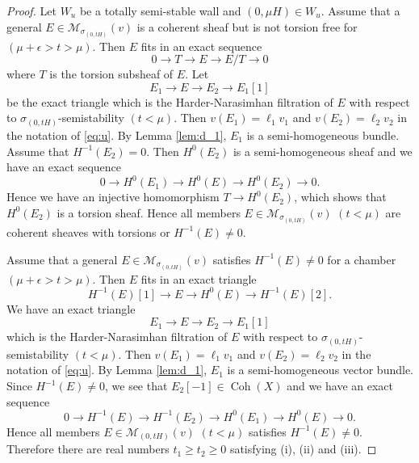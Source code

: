 \documentclass[10pt]{amsart}
\def\cal{\mathcal}
\newcommand{\Coh}{\operatorname{Coh}}
\numberwithin{equation}{section}
\theoremstyle{plain}
\theoremstyle{definition}
\theoremstyle{remark}
\begin{document}
\begin{proof}
Let $W_{u}$ be a totally semi-stable wall and $(0,\mu H) \in W_{u}$. 
Assume that a general $E \in {\cal M}_{\sigma_{(0,tH)}}(v)$ is a coherent sheaf but 
is not torsion free for $(\mu+\epsilon >t>\mu)$.
Then $E$ fits in an exact sequence
$$
0 \to T \to E \to E/T \to 0
$$
where $T$ is the torsion subsheaf of $E$.
Let   
$$
E_1 \to E \to E_2 \to E_1[1]
$$
be the exact triangle
which is the Harder-Narasimhan filtration of $E$ 
with respect to $\sigma_{(0,tH)}$-semistability $(t<\mu)$. 
Then $v(E_1)=\ell_1 v_1$ and $v(E_2)=\ell_2 v_2$ in the notation of \eqref{eq:u}.
By Lemma \ref{lem:d_1}, $E_1$ is a semi-homogeneous bundle.
Assume that $H^{-1}(E_2)=0$.
Then $H^0(E_2)$ is a semi-homogeneous sheaf and
we have an exact sequence
\begin{equation}\label{eq:T}
0 \to H^0(E_1) \to H^0(E) \to H^0(E_2) \to 0.
\end{equation}
Hence we have an injective homomorphism $T \to H^0(E_2)$, which
shows that $H^0(E_2)$ is a torsion sheaf. 
Hence all members $E \in {\cal M}_{\sigma_{(0,tH)}}(v)$ $(t<\mu)$
are 
coherent sheaves with torsions or $H^{-1}(E) \ne 0$.

Assume that a general $E \in {\cal M}_{\sigma_{(0,tH)}}(v)$
satisfies $H^{-1}(E) \ne 0$ 
for a chamber $(\mu+\epsilon>t>\mu)$.
Then $E$ 
fits in an exact triangle
$$
H^{-1}(E)[1] \to E \to H^0(E) \to H^{-1}(E)[2].
$$
We have an exact triangle   
$$
E_1 \to E \to E_2 \to E_1[1]
$$
which is the Harder-Narasimhan filtration of $E$ 
with respect to $\sigma_{(0,tH)}$-semistability $(t<\mu)$. 
Then $v(E_1)=\ell_1 v_1$ and $v(E_2)=\ell_2 v_2$ in the notation of \eqref{eq:u}.
By Lemma \ref{lem:d_1}, $E_1$ is a semi-homogeneous vector bundle.
Since $H^{-1}(E) \ne 0$, we see that $E_2[-1] \in \Coh(X)$ and   
we have an exact sequence
\begin{equation}\label{eq:E_2}
0 \to H^{-1}(E) \to H^{-1}(E_2) \to H^0(E_1) \to H^0(E) \to 0. 
\end{equation}
Hence all members $E \in {\cal M}_{(0,tH)}(v)$ $(t<\mu)$
satisfies $H^{-1}(E) \ne 0$.
Therefore there are real numbers $t_1 \geq t_2 \geq 0$
satisfying (i), (ii) and (iii).
\end{proof}
\end{document}
